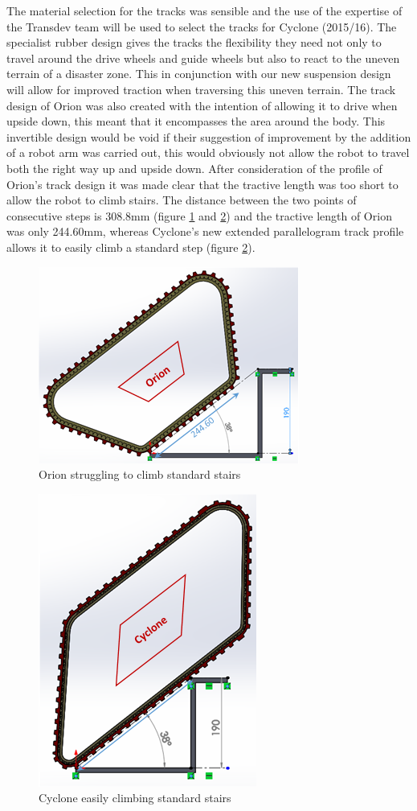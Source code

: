 The material selection for the tracks was sensible and the use of the expertise of the Transdev team will be used to select the tracks for Cyclone (2015/16). The specialist rubber design gives the tracks the flexibility they need not only to travel around the drive wheels and guide wheels but also to react to the uneven terrain of a disaster zone. This in conjunction with our new suspension design will allow for improved traction when traversing this uneven terrain. The track design of Orion was also created with the intention of allowing it to drive when upside down, this meant that it encompasses the area around the body. This invertible design would be void if their suggestion of improvement by the addition of a robot arm was carried out, this would obviously not allow the robot to travel both the right way up and upside down. After consideration of the profile of Orion’s track design it was made clear that the tractive length was too short to allow the robot to climb stairs. The distance between the two points of consecutive steps is 308.8mm (figure \ref{fig:Orionstairs} and \ref{fig:Cyclonestairs}) and the tractive length of Orion was only 244.60mm, whereas Cyclone’s new extended parallelogram track profile allows it to easily climb a standard step (figure \ref{fig:Cyclonestairs}).\par

\begin{figure}[h]
\centering\includegraphics[width=0.5\linewidth]{Images/DT_Fig_2.png}
\caption{Orion struggling to climb standard stairs}
\label{fig:Orionstairs}
\end{figure}

\begin{figure}[h]
\centering\includegraphics[width=0.4\linewidth]{Images/DT_Fig_3.png}
\caption{Cyclone easily climbing standard stairs}
\label{fig:Cyclonestairs}
\end{figure}

